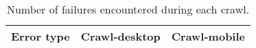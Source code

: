 \begin{table}[ht] 
\caption{Number of failures encountered during each crawl.} 
\centering 
\begin{tabular}{|l|r|r|} 
\hline 
\textbf{Error type} & \multicolumn{1}{l|}{\textbf{Crawl-desktop}} & \multicolumn{1}{l|}{\textbf{Crawl-mobile}} \\ \hline 
\end{tabular} 
\label{table:NumberOfFailures} 
\end{table}